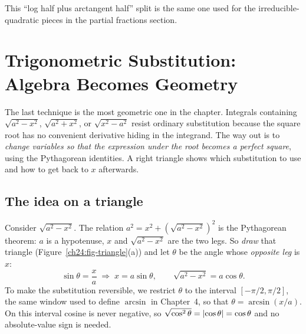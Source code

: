 This ``log half plus arctangent half'' split is the same one used for the
irreducible-quadratic pieces in the partial fractions section.

\section{Trigonometric Substitution: Algebra Becomes Geometry}
\label{ch24:trig-sub}

The last technique is the most geometric one in the chapter. Integrals
containing $\sqrt{a^2 - x^2}$, $\sqrt{a^2 + x^2}$, or $\sqrt{x^2 - a^2}$ resist
ordinary substitution because the square root has no convenient derivative
hiding in the integrand. The way out is to \emph{change variables so that the
expression under the root becomes a perfect square}, using the Pythagorean
identities. A right triangle shows which substitution to use and how to get
back to $x$ afterwards.

\subsection{The idea on a triangle}

Consider $\sqrt{a^2 - x^2}$. The relation $a^2 = x^2 + (\sqrt{a^2-x^2})^2$ is
the Pythagorean theorem: $a$ is a hypotenuse, $x$ and $\sqrt{a^2-x^2}$ are the
two legs. So \emph{draw} that triangle (Figure~\ref{ch24:fig-triangle}(a)) and
let $\theta$ be the angle whose \emph{opposite leg} is $x$:
\[
\sin\theta = \frac{x}{a} \;\Longrightarrow\; x = a\sin\theta,
\qquad
\sqrt{a^2 - x^2} = a\cos\theta.
\]
To make the substitution reversible, we restrict $\theta$ to the interval
$[-\pi/2, \pi/2]$, the same window used to define $\arcsin$ in Chapter~4, so
that $\theta = \arcsin(x/a)$. On this interval cosine is never negative, so
$\sqrt{\cos^2\theta} = \lvert\cos\theta\rvert = \cos\theta$ and no absolute-value sign
is needed.

